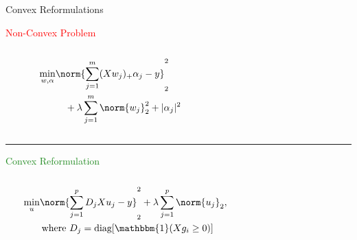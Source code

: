 \documentclass[usenames,dvipsnames,mathserif,notheorems]{beamer}
\begin{document}
\begin{frame}{Convex Reformulations}

	\vspace{0.2em}
	{\large \textcolor{Red}{Non-Convex Problem}}
	\vspace{-1em}
	\begin{columns}
		\centering
		\begin{column}{0.2\linewidth}
			\small
			\[
				\begin{aligned}
					\min_{w, \alpha} & \norm{\sum_{j=1}^m (X w_j)_+ \alpha_j - y}_2^2             \\
					                 & \quad + \lambda \sum_{j=1}^m \norm{w_j}_2^2 + |\alpha_j|^2
				\end{aligned}
			\]
		\end{column}

		\begin{column}{0.7\linewidth}
			\begin{figure}[t]
				\raggedleft
				
			\end{figure}
		\end{column}
	\end{columns}


	\pause

	{
		\vspace{-0.5em}
		\center \rule{\textwidth}{0.1em}
		\vspace{-0.2em}
	}

	{\large \textcolor{ForestGreen}{Convex Reformulation}}
	\vspace{-2em}
	\begin{columns}
		\begin{column}{0.2\linewidth}
			\vspace{1.5em}
			\small
			\[
				\begin{aligned}
					\min_{u} & \norm{\sum_{j=1}^p D_j X u_j - y}_2^2 +
					\lambda \sum_{j=1}^p \norm{u_j}_2,                 \\
					         & \hspace{0.2em} \text{where }
					D_j = \text{diag}[\mathbbm{1}(X g_i \geq 0)]
				\end{aligned}
			\]
		\end{column}
		\begin{column}{0.7\linewidth}
			\vspace{-1.5em}
			\begin{figure}[t]
				\raggedleft
				
			\end{figure}
		\end{column}
	\end{columns}
\end{frame}
\end{document}
